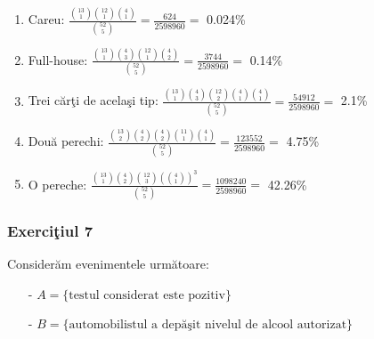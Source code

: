 \documentclass[]{article}
\begin{document}
\begin{enumerate}
\def\labelenumi{\alph{enumi})}
\item
  Careu:
  \(\frac{\binom{13}{1}\binom{12}{1}\binom{4}{1}}{\binom{52}{5}}=\frac{624}{2598960}=\)
  0.024\%
\item
  Full-house:
  \(\frac{\binom{13}{1}\binom{4}{3}\binom{12}{1}\binom{4}{2}}{\binom{52}{5}}=\frac{3744}{2598960}=\)
  0.14\%
\item
  Trei c\u ar\c ti de acela\c si tip:
  \(\frac{\binom{13}{1}\binom{4}{3}\binom{12}{2}\binom{4}{1}\binom{4}{1}}{\binom{52}{5}}=\frac{54912}{2598960}=\)
  2.1\%
\item
  Dou\u a perechi:
  \(\frac{\binom{13}{2}\binom{4}{2}\binom{4}{2}\binom{11}{1}\binom{4}{1}}{\binom{52}{5}}=\frac{123552}{2598960}=\)
  4.75\%
\item
  O pereche:
  \(\frac{\binom{13}{1}\binom{4}{2}\binom{12}{3}\left(\binom{4}{1}\right)^3}{\binom{52}{5}}=\frac{1098240}{2598960}=\)
  42.26\%
\end{enumerate}

\subsubsection{\texorpdfstring{Exerci\c tiul
7}{Exerciiul 7}}\label{exerciiul-7}

Consider\u am evenimentele urm\u atoare:

\begin{itemize}
  \item[-] $A=\{\mbox{testul considerat este pozitiv}\}$ 
  \item[-] $B=\{\mbox{automobilistul a dep\u a\c sit nivelul de alcool autorizat}\}$
\end{itemize}
\end{document}
